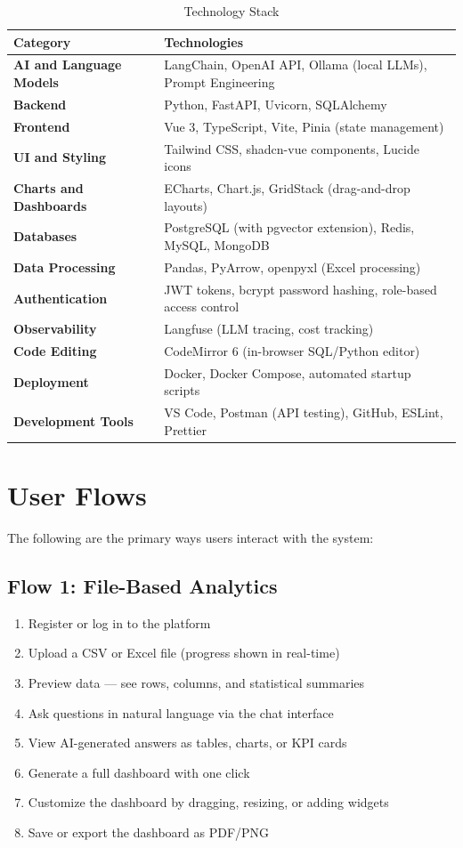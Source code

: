 \documentclass[12pt,a4paper]{report}
\begin{document}
\begin{table}[H]
\centering
\caption{Technology Stack}
\begin{tabular}{>{\bfseries}p{4.5cm} p{8cm}}
\toprule
\textbf{Category} & \textbf{Technologies} \\
\midrule
AI and Language Models & LangChain, OpenAI API, Ollama (local LLMs), Prompt Engineering \\
Backend & Python, FastAPI, Uvicorn, SQLAlchemy \\
Frontend & Vue 3, TypeScript, Vite, Pinia (state management) \\
UI and Styling & Tailwind CSS, shadcn-vue components, Lucide icons \\
Charts and Dashboards & ECharts, Chart.js, GridStack (drag-and-drop layouts) \\
Databases & PostgreSQL (with pgvector extension), Redis, MySQL, MongoDB \\
Data Processing & Pandas, PyArrow, openpyxl (Excel processing) \\
Authentication & JWT tokens, bcrypt password hashing, role-based access control \\
Observability & Langfuse (LLM tracing, cost tracking) \\
Code Editing & CodeMirror 6 (in-browser SQL/Python editor) \\
Deployment & Docker, Docker Compose, automated startup scripts \\
Development Tools & VS Code, Postman (API testing), GitHub, ESLint, Prettier \\
\bottomrule
\end{tabular}
\label{tab:techstack}
\end{table}

\section{User Flows}

The following are the primary ways users interact with the system:

\subsection{Flow 1: File-Based Analytics}

\begin{enumerate}[leftmargin=1.5cm]
    \item Register or log in to the platform
    \item Upload a CSV or Excel file (progress shown in real-time)
    \item Preview data --- see rows, columns, and statistical summaries
    \item Ask questions in natural language via the chat interface
    \item View AI-generated answers as tables, charts, or KPI cards
    \item Generate a full dashboard with one click
    \item Customize the dashboard by dragging, resizing, or adding widgets
    \item Save or export the dashboard as PDF/PNG
\end{enumerate}
\end{document}
